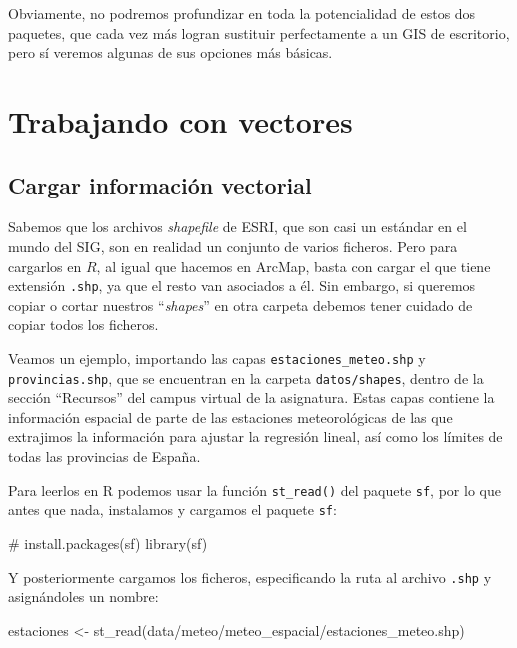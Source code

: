 \documentclass[
  letterpaper,
  DIV=11,
  numbers=noendperiod]{scrreprt}
\newenvironment{Shaded}{\begin{snugshade}}{\end{snugshade}}
\newcommand{\CommentTok}[1]{\textcolor[rgb]{0.37,0.37,0.37}{#1}}
\newcommand{\FunctionTok}[1]{\textcolor[rgb]{0.28,0.35,0.67}{#1}}
\newcommand{\NormalTok}[1]{\textcolor[rgb]{0.00,0.23,0.31}{#1}}
\newcommand{\OtherTok}[1]{\textcolor[rgb]{0.00,0.23,0.31}{#1}}
\newcommand{\StringTok}[1]{\textcolor[rgb]{0.13,0.47,0.30}{#1}}
\begin{document}
Obviamente, no podremos profundizar en toda la potencialidad de estos
dos paquetes, que cada vez más logran sustituir perfectamente a un GIS
de escritorio, pero sí veremos algunas de sus opciones más básicas.

\hypertarget{trabajando-con-vectores-1}{%
\section{Trabajando con vectores}\label{trabajando-con-vectores-1}}

\hypertarget{cargar-informaciuxf3n-vectorial}{%
\subsection{Cargar información
vectorial}\label{cargar-informaciuxf3n-vectorial}}

Sabemos que los archivos \emph{shapefile} de ESRI, que son casi un
estándar en el mundo del SIG, son en realidad un conjunto de varios
ficheros. Pero para cargarlos en \(R\), al igual que hacemos en ArcMap,
basta con cargar el que tiene extensión \texttt{.shp}, ya que el resto
van asociados a él. Sin embargo, si queremos copiar o cortar nuestros
``\emph{shapes}'' en otra carpeta debemos tener cuidado de copiar todos
los ficheros.

Veamos un ejemplo, importando las capas \texttt{estaciones\_meteo.shp} y
\texttt{provincias.shp}, que se encuentran en la carpeta
\texttt{datos/shapes}, dentro de la sección ``Recursos'' del campus
virtual de la asignatura. Estas capas contiene la información espacial
de parte de las estaciones meteorológicas de las que extrajimos la
información para ajustar la regresión lineal, así como los límites de
todas las provincias de España.

Para leerlos en R podemos usar la función \texttt{st\_read()} del
paquete \texttt{sf}, por lo que antes que nada, instalamos y cargamos el
paquete \texttt{sf}:

\begin{Shaded}
\begin{Highlighting}[]
\CommentTok{\# install.packages(\textquotesingle{}sf\textquotesingle{})}
\FunctionTok{library}\NormalTok{(sf)}
\end{Highlighting}
\end{Shaded}

Y posteriormente cargamos los ficheros, especificando la ruta al archivo
\texttt{.shp} y asignándoles un nombre:

\begin{Shaded}
\begin{Highlighting}[]
\NormalTok{estaciones }\OtherTok{\textless{}{-}} \FunctionTok{st\_read}\NormalTok{(}\StringTok{\textquotesingle{}data/meteo/meteo\_espacial/estaciones\_meteo.shp\textquotesingle{}}\NormalTok{) }
\end{Highlighting}
\end{Shaded}
\end{document}
